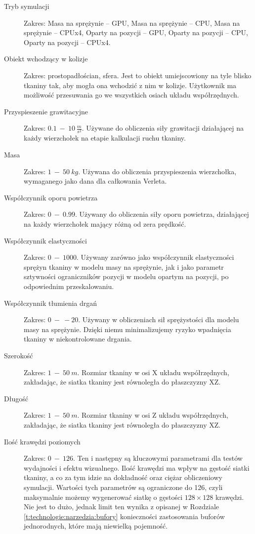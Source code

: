 		\begin{description}
			
			\item[Tryb symulacji] Zakres: Masa na sprężynie -- GPU, Masa na sprężynie -- CPU, Masa na sprężynie -- CPUx4, Oparty na pozycji -- GPU, Oparty na pozycji -- CPU, Oparty na pozycji -- CPUx4.
			
			\item[Obiekt wchodzący w kolizje] Zakres: prostopadłościan, sfera. Jest to obiekt umiejscowiony na tyle blisko tkaniny tak, aby mogła ona wchodzić z nim w kolizje. Użytkownik ma możliwość przesuwania go we wszystkich osiach układu współrzędnych.
			
			\item[Przyspieszenie grawitacyjne] Zakres: \(0.1\ -\ 10\ \frac{m}{s^{2}} \). Używane do obliczenia siły grawitacji działającej na każdy wierzchołek na etapie kalkulacji ruchu tkaniny.
			
			\item[Masa] Zakres: \(1\ -\ 50\ kg\). Używana do obliczenia przyspieszenia wierzchołka, wymaganego jako dana dla całkowania Verleta.
			
			\item[Współczynnik oporu powietrza] Zakres: \(0\ -\ 0.99\). Używany do obliczenia siły oporu powietrza, działającej na każdy wierzchołek mający różną od zera prędkość.
			
			\item[Współczynnik elastyczności] Zakres: \(0\ -\ 1000\). Używany zarówno jako współczynnik elastyczności sprężyn tkaniny w modelu masy na sprężynie, jak i jako parametr sztywności ograniczników pozycji w modelu opartym na pozycji, po odpowiednim przeskalowaniu.
			
			\item[Współczynnik tłumienia drgań] Zakres: \(0\ -\ -20\). Używany w obliczeniach sił sprężystości dla modelu masy na sprężynie. Dzięki niemu minimalizujemy ryzyko wpadnięcia tkaniny w niekontrolowane drgania.
			
			\item[Szerokość] Zakres: \(1\ -\ 50\ m\). Rozmiar tkaniny w osi X układu współrzędnych, zakładając, że siatka tkaniny jest równoległa do płaszczyzny XZ.
			
			\item[Długość]Zakres: \(1\ -\ 50\ m\). Rozmiar tkaniny w osi Z układu współrzędnych, zakładając, że siatka tkaniny jest równoległa do płaszczyzny XZ.
			
			\item[Ilość krawędzi poziomych] Zakres: \(0\ -\ 126\). Ten i następny są kluczowymi parametrami dla testów wydajności i efektu wizualnego. Ilość krawędzi ma wpływ na gęstość siatki tkaniny, a co za tym idzie na dokładność oraz ciężar obliczeniowy symulacji. Wartości tych parametrów są ograniczone do 126, czyli maksymalnie możemy wygenerować siatkę o gęstości \( 128 \times 128 \) krawędzi. Nie jest to dużo, jednak limit ten wynika z opisanej w Rozdziale \ref{t:technologie:narzedzia:bufory} konieczności zastosowania buforów jednorodnych, które mają niewielką pojemność.
			

\end{description}
